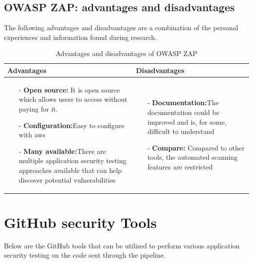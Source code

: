 \subsection{OWASP ZAP: advantages and disadvantages}
The following advantages and disadvantages are a combination of the personal experiences and information found during research.\cite{prosconsZAP}
\begin{table}[H]
    \begin{threeparttable}
        \begin{tabular}{|>{\raggedright\arraybackslash}p{6cm}|>{\raggedright\arraybackslash}p{6cm}|}
            \hline
            \textbf{Advantages} & \textbf{Disadvantages} \\
            \hline
            \begin{itemize}
                \item [-]\textbf{Open source:} It is open source which allows users to access without paying for it. 
                \item [-]\textbf{Configuration:}Easy to configure with \acrshort{aws}
                \item [-]\textbf{Many available:}There are multiple application security testing approaches available that can help discover potential vulnerabilities
            \end{itemize}
            &
            \begin{itemize}
                \item [-] \textbf{Documentation:}The documentation could be improved and is, for some, difficult to understand
                \item [-]\textbf{Compare:} Compared to other tools, the automated scanning features are restricted
            \end{itemize}
            \\
            \hline
        \end{tabular}
            \caption{Advantages and disadvantages of OWASP ZAP}
    \end{threeparttable}
\end{table}


\section{GitHub security Tools}
Below are the GitHub tools that can be utilized to perform various application security testing on the code sent through the pipeline. 
